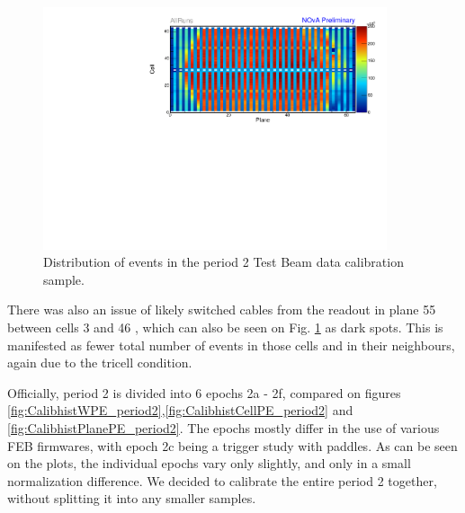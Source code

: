 \begin{figure}[h]
\centering
\includegraphics[width=0.9\textwidth]{PlotsTBCalibTechnote/Attenprofs_P2Data_CellPlane_AllRuns.pdf}
\caption{Distribution of events in the period 2 Test Beam data calibration sample.}
\label{fig:Calibhist_period2}
\end{figure}

There was also an issue of likely switched cables from the readout in plane 55 between cells 3 and 46 \cite{NOVA-doc-49674}, which can also be seen on Fig. \ref{fig:Calibhist_period2} as dark spots. This is manifested as fewer total number of events in those cells and in their neighbours, again due to the tricell condition.

Officially, period 2 is divided into 6 epochs 2a - 2f, compared on figures \ref{fig:CalibhistWPE_period2},\ref{fig:CalibhistCellPE_period2} and \ref{fig:CalibhistPlanePE_period2}. The epochs mostly differ in the use of various FEB firmwares, with epoch 2c being a trigger study with paddles. As can be seen on the plots, the individual epochs vary only slightly, and only in a small normalization difference. We decided to calibrate the entire period 2 together, without splitting it into any smaller samples.

